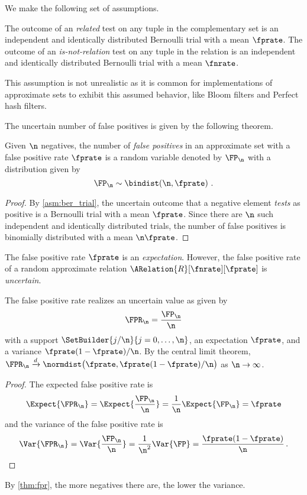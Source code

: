 \documentclass[ ../main.tex]{subfiles}
\begin{document}
We make the following set of assumptions.
\begin{assumption}
	\label{asm:ber_trial}
	The outcome of an \emph{related} test on any tuple in the complementary set is an independent and identically distributed Bernoulli trial with a mean $\fprate$.
	The outcome of an \emph{is-not-relation} test on any tuple in the relation is an independent and identically distributed Bernoulli trial with a mean $\fnrate$.
\end{assumption}
This assumption is not unrealistic as it is common for implementations of approximate sets to exhibit this assumed behavior, like Bloom filters\cite{bf} and Perfect hash filters\cite{phf}.

The uncertain number of false positives is given by the following theorem.
\begin{theorem}
	\label{thm:fpbinom}
	Given $\n$ negatives, the number of \emph{false positives} in an approximate set with a false positive rate $\fprate$ is a random variable denoted by $\FP_\n$ with a distribution given by
	\begin{equation}
		\FP_\n \sim \bindist\!\left(\n, \fprate\right)\,.
	\end{equation}
\end{theorem}
\begin{proof}
	By \cref{asm:ber_trial}, the uncertain outcome that a negative element \emph{tests} as positive is a Bernoulli trial with a mean $\fprate$. Since there are $\n$ such independent and identically distributed trials, the number of false positives is binomially distributed with a mean $\n \fprate$.
\end{proof}

The false positive rate $\fprate$ is an \emph{expectation}. However, the false positive rate of a random approximate relation $\ARelation{R}[\fnrate][\fprate]$ is \emph{uncertain}.
\begin{theorem}
	\label{thm:fpr}
	The false positive rate realizes an uncertain value as given by
	\begin{equation}
		\FPR_\n = \frac{\FP_\n}{\n}
	\end{equation}
	with a support $\SetBuilder{ j / \n}{j = 0,\ldots,\n}$, an expectation $\fprate$, and a variance $\fprate(1-\fprate) / \n$. By the central limit theorem, $\FPR_\n \xrightarrow{d} \normdist\!\left(\fprate, \fprate(1-\fprate) / \n\right)$ as $\n \to \infty$.
\end{theorem}
\begin{proof}
	The expected false positive rate is
	\begin{equation}
		\Expect{\FPR_\n} = \Expect{\frac{\FP_\n}{\n}} = \frac{1}{\n}\Expect{\FP_\n} = \fprate
	\end{equation}
	and the variance of the false positive rate is
	\begin{equation}
		\Var{\FPR_\n} = \Var{\frac{\FP_\n}{\n}} = \frac{1}{\n^2}\Var{\FP} = \frac{\fprate(1-\fprate)}{\n}\,.
	\end{equation}
\end{proof}
By \cref{thm:fpr}, the more negatives there are, the lower the variance.
\end{document}
